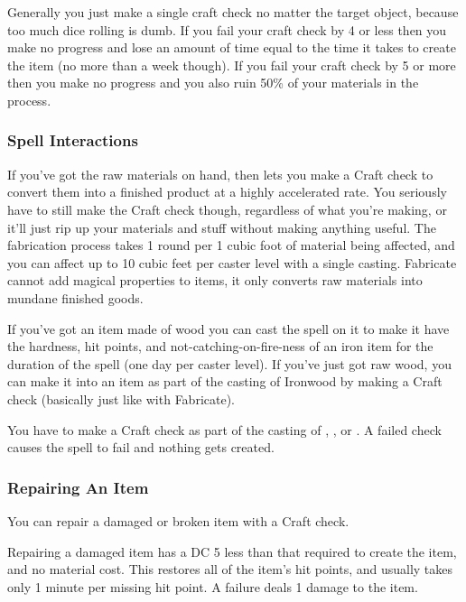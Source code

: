 Generally you just make a single craft check no matter the target object, because too much dice rolling is dumb. If you fail your craft check by 4 or less then you make no progress and lose an amount of time equal to the time it takes to create the item (no more than a week though). If you fail your craft check by 5 or more then you make no progress and you also ruin 50\% of your materials in the process.

\subsubsection{Spell Interactions}

If you've got the raw materials on hand, then  lets you make a Craft check to convert them into a finished product at a highly accelerated rate. You seriously have to still make the Craft check though, regardless of what you're making, or it'll just rip up your materials and stuff without making anything useful. The fabrication process takes 1 round per 1 cubic foot of material being affected, and you can affect up to 10 cubic feet per caster level with a single casting. Fabricate cannot add magical properties to items, it only converts raw materials into mundane finished goods.

If you've got an item made of wood you can cast the  spell on it to make it have the hardness, hit points, and not-catching-on-fire-ness of an iron item for the duration of the spell (one day per caster level). If you've just got raw wood, you can make it into an item as part of the casting of Ironwood by making a Craft check (basically just like with Fabricate).

You have to make a Craft check as part of the casting of , , or . A failed check causes the spell to fail and nothing gets created.

\subsubsection{Repairing An Item}

You can repair a damaged or broken item with a Craft check.

Repairing a damaged item has a DC 5 less than that required to create the item, and no material cost. This restores all of the item's hit points, and usually takes only 1 minute per missing hit point. A failure deals 1 damage to the item.

